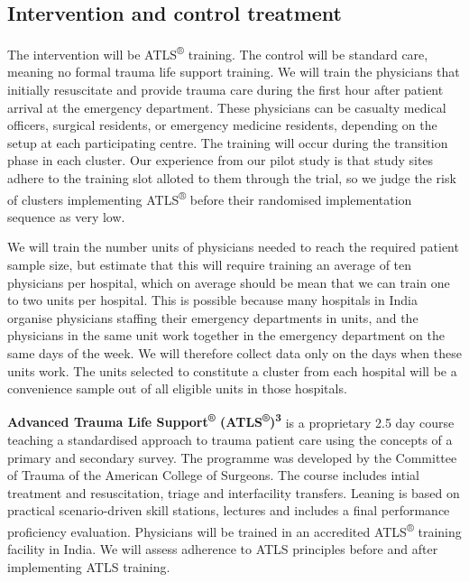 \documentclass[
]{scrartcl}
\begin{document}
\subsection{Intervention and control
treatment}\label{sec-intervention-and-control-treatment}

The intervention will be ATLS\textsuperscript{®} training. The control
will be standard care, meaning no formal trauma life support training.
We will train the physicians that initially resuscitate and provide
trauma care during the first hour after patient arrival at the emergency
department. These physicians can be casualty medical officers, surgical
residents, or emergency medicine residents, depending on the setup at
each participating centre. The training will occur during the transition
phase in each cluster. Our experience from our pilot study is that study
sites adhere to the training slot alloted to them through the trial, so
we judge the risk of clusters implementing ATLS\textsuperscript{®}
before their randomised implementation sequence as very low.

We will train the number units of physicians needed to reach the
required patient sample size, but estimate that this will require
training an average of ten physicians per hospital, which on average
should be mean that we can train one to two units per hospital. This is
possible because many hospitals in India organise physicians staffing
their emergency departments in units, and the physicians in the same
unit work together in the emergency department on the same days of the
week. We will therefore collect data only on the days when these units
work. The units selected to constitute a cluster from each hospital will
be a convenience sample out of all eligible units in those hospitals.

\textbf{Advanced Trauma Life Support\textsuperscript{®}
(ATLS\textsuperscript{®})\textsuperscript{3}} is a proprietary 2.5 day
course teaching a standardised approach to trauma patient care using the
concepts of a primary and secondary survey. The programme was developed
by the Committee of Trauma of the American College of Surgeons. The
course includes intial treatment and resuscitation, triage and
interfacility transfers. Leaning is based on practical scenario-driven
skill stations, lectures and includes a final performance proficiency
evaluation. Physicians will be trained in an accredited
ATLS\textsuperscript{®} training facility in India. We will assess
adherence to ATLS principles before and after implementing ATLS
training.
\end{document}
